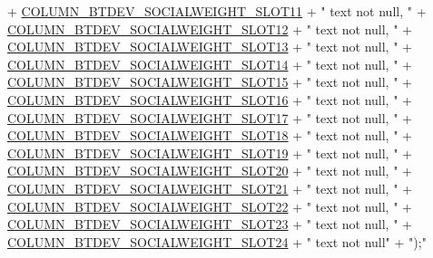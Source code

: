\begin{DoxyCode}
            + \hyperlink{classcs_1_1nsense_1_1db_1_1_n_sense_s_q_lite_helper_a15720b6758996b12d01098b5c69a5cf1}{COLUMN\_BTDEV\_SOCIALWEIGHT\_SLOT11} + \textcolor{stringliteral}{" text not null, "}
            + \hyperlink{classcs_1_1nsense_1_1db_1_1_n_sense_s_q_lite_helper_a77faece94b4e52583a43ecae43490ba3}{COLUMN\_BTDEV\_SOCIALWEIGHT\_SLOT12} + \textcolor{stringliteral}{" text not null, "}
            + \hyperlink{classcs_1_1nsense_1_1db_1_1_n_sense_s_q_lite_helper_a9f6a0352030105ea7c51243b9f20d2af}{COLUMN\_BTDEV\_SOCIALWEIGHT\_SLOT13} + \textcolor{stringliteral}{" text not null, "}
            + \hyperlink{classcs_1_1nsense_1_1db_1_1_n_sense_s_q_lite_helper_af5dccc4390220fd85b4e79bbca7c2879}{COLUMN\_BTDEV\_SOCIALWEIGHT\_SLOT14} + \textcolor{stringliteral}{" text not null, "}
            + \hyperlink{classcs_1_1nsense_1_1db_1_1_n_sense_s_q_lite_helper_aa68b0c0c8363dd4ac743e8032962fb61}{COLUMN\_BTDEV\_SOCIALWEIGHT\_SLOT15} + \textcolor{stringliteral}{" text not null, "}
            + \hyperlink{classcs_1_1nsense_1_1db_1_1_n_sense_s_q_lite_helper_abee33f90ba813221b66b297fd29ee0b3}{COLUMN\_BTDEV\_SOCIALWEIGHT\_SLOT16} + \textcolor{stringliteral}{" text not null, "}
            + \hyperlink{classcs_1_1nsense_1_1db_1_1_n_sense_s_q_lite_helper_a39e624085739d00cfec1244154401d95}{COLUMN\_BTDEV\_SOCIALWEIGHT\_SLOT17} + \textcolor{stringliteral}{" text not null, "}
            + \hyperlink{classcs_1_1nsense_1_1db_1_1_n_sense_s_q_lite_helper_a7983ef2177f51a449da7b68a5343cc84}{COLUMN\_BTDEV\_SOCIALWEIGHT\_SLOT18} + \textcolor{stringliteral}{" text not null, "}
            + \hyperlink{classcs_1_1nsense_1_1db_1_1_n_sense_s_q_lite_helper_ab0c1f50ed163bd3b4057a9e4ba57a056}{COLUMN\_BTDEV\_SOCIALWEIGHT\_SLOT19} + \textcolor{stringliteral}{" text not null, "}
            + \hyperlink{classcs_1_1nsense_1_1db_1_1_n_sense_s_q_lite_helper_a121f5f29c559e58d1af9815678031c19}{COLUMN\_BTDEV\_SOCIALWEIGHT\_SLOT20} + \textcolor{stringliteral}{" text not null, "}
            + \hyperlink{classcs_1_1nsense_1_1db_1_1_n_sense_s_q_lite_helper_a72d9ba1ef178bc4d32717e2347b39645}{COLUMN\_BTDEV\_SOCIALWEIGHT\_SLOT21} + \textcolor{stringliteral}{" text not null, "}
            + \hyperlink{classcs_1_1nsense_1_1db_1_1_n_sense_s_q_lite_helper_a0e2d7e92cafb6c8c4cdbea690e508669}{COLUMN\_BTDEV\_SOCIALWEIGHT\_SLOT22} + \textcolor{stringliteral}{" text not null, "}
            + \hyperlink{classcs_1_1nsense_1_1db_1_1_n_sense_s_q_lite_helper_a4025037f837af731eeef0e47967a0f21}{COLUMN\_BTDEV\_SOCIALWEIGHT\_SLOT23} + \textcolor{stringliteral}{" text not null, "}
            + \hyperlink{classcs_1_1nsense_1_1db_1_1_n_sense_s_q_lite_helper_aa10b4323dffe120b65d76c52511d877f}{COLUMN\_BTDEV\_SOCIALWEIGHT\_SLOT24} + \textcolor{stringliteral}{" text not null"}
            + \textcolor{stringliteral}{");"}
\end{DoxyCode}
